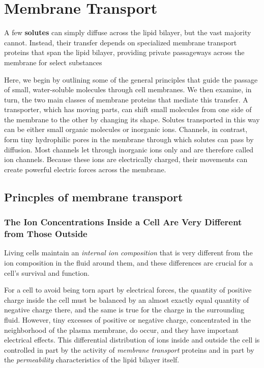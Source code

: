 \chapter{Membrane Transport}

A few \textbf{solutes} can simply diffuse across the lipid bilayer, but
the vast majority cannot. Instead, their transfer depends on specialized
membrane transport proteins that span the lipid bilayer, providing
private passageways across the membrane for select substances

Here, we begin by outlining some of the general principles that guide the passage
of small, water-soluble molecules through cell membranes. We then
examine, in turn, the two main classes of membrane proteins that mediate
this transfer. A transporter, which has moving parts, can shift small
molecules from one side of the membrane to the other by changing its
shape. Solutes transported in this way can be either small organic molecules
or inorganic ions. Channels, in contrast, form tiny hydrophilic pores
in the membrane through which solutes can pass by diffusion. Most channels
let through inorganic ions only and are therefore called ion channels.
Because these ions are electrically charged, their movements can create
powerful electric forces across the membrane.

\section{Princples of membrane transport}

\subsection{The Ion Concentrations Inside a Cell Are Very Different from Those Outside}

Living cells maintain an \textit{internal ion composition} that is very different
from the ion composition in the fluid around them, and these differences
are crucial for a cell’s survival and function.

For a cell to avoid being torn apart by electrical forces, the quantity of positive charge inside the
cell must be balanced by an almost exactly equal quantity of negative
charge there, and the same is true for the charge in the surrounding fluid.
However, tiny excesses of positive or negative charge, concentrated in
the neighborhood of the plasma membrane, do occur, and they have
important electrical effects.
This differential distribution of ions inside and outside the cell is controlled
in part by the activity of \textit{membrane transport} proteins and in part by the
\textit{permeability} characteristics of the lipid bilayer itself.

